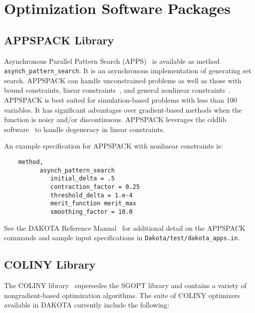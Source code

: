 \section{Optimization Software Packages}\label{opt:software}

\subsection{APPSPACK Library}\label{opt:software:apps}

Asynchronous Parallel Pattern Search (APPS)~\cite{GrKo06} is available
as method \texttt{asynch\_pattern\_search}.  It is an asynchronous
implementation of generating set search.  APPSPACK can handle
unconstrained problems as well as those with bound constraints, linear
constraints~\cite{GrKoLe08}, and general nonlinear
constraints~\cite{GrKo07}.  APPSPACK is best suited for
simulation-based problems with less than 100 variables.  It has
significant advantages over gradient-based methods when the function
is noisy and/or discontinuous.  APPSPACK leverages the cddlib
software~\cite{Fu05} to handle degeneracy in linear constraints.

An example specification for APPSPACK with nonlinear constraints is:
\begin{small}
\begin{verbatim}
    method,
          asynch_pattern_search
             initial_delta = .5
             contraction_factor = 0.25
             threshold_delta = 1.e-4
             merit_function merit_max
             smoothing_factor = 10.0
\end{verbatim}
\end{small} %

See the DAKOTA Reference Manual~\cite{RefMan} for additional detail on the
APPSPACK commands and sample input specifications in {\tt Dakota/test/dakota\_apps.in}.

\subsection{COLINY Library}\label{opt:software:coliny}

The COLINY library~\cite{Har06} supersedes the SGOPT library and contains
a variety of nongradient-based optimization algorithms. The suite of
COLINY optimizers available in DAKOTA currently include the following:

